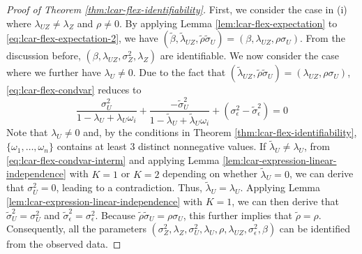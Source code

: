 \documentclass[11pt]{article}
\theoremstyle{definition}
\theoremstyle{remark}
\begin{document}
\begin{proof}[Proof of Theorem \ref{thm:lcar-flex-identifiability}]
First, we consider the case in (i) where $\lambda_{UZ}\neq\lambda_Z$ and $\rho \neq 0$. By applying Lemma \ref{lem:lcar-flex-expectation} to \eqref{eq:lcar-flex-expectation-2}, we have $(\tilde\beta, \tilde\lambda_{UZ}, \tilde\rho\tilde\sigma_U) = (\beta, \lambda_{UZ}, \rho\sigma_U)$. 
From the discussion before, $(\beta, \lambda_{UZ}, \sigma_Z^2, \lambda_Z)$ are identifiable. 
We now consider the case where we further have $\lambda_U\neq 0$. 
Due to the fact that $( \tilde\lambda_{UZ}, \tilde\rho\tilde\sigma_U) = ( \lambda_{UZ}, \rho\sigma_U)$, \eqref{eq:lcar-flex-condvar} reduces to 
\begin{equation}\label{eq:lcar-flex-condvar-interm}
\frac{\sigma_U^2}{1-\lambda_U+\lambda_U\omega_i} +
\frac{-\tilde\sigma_U^2}{1-\tilde\lambda_U+\tilde\lambda_U\omega_i} 
+ 
(\sigma_\epsilon^2 - \tilde\sigma_\epsilon^2) = 0
\end{equation} 
Note that $\lambda_U\neq 0$ and, by the conditions in Theorem \ref{thm:lcar-flex-identifiability}, $\{\omega_1,\ldots,\omega_n\}$ contains at least 3 distinct nonnegative values. If $\tilde\lambda_U \neq \lambda_U$, from \eqref{eq:lcar-flex-condvar-interm} and applying Lemma \ref{lem:lcar-expression-linear-independence} with $K=1$ or $K=2$ depending on whether $\tilde\lambda_U=0$, we can derive that $\sigma_U^2=0$, leading to a contradiction. Thus, $\tilde\lambda_U = \lambda_U$. Applying Lemma \ref{lem:lcar-expression-linear-independence} with $K=1$, we can then derive that $\tilde\sigma_U^2 = \sigma_U^2$ and $\tilde\sigma_\epsilon^2 = \sigma_\epsilon^2$. 
Because $\tilde\rho\tilde\sigma_U = \rho\sigma_U$, this further implies that $\tilde\rho = \rho$. 
Consequently, all the parameters $(\sigma_Z^2, \lambda_Z, \sigma_U^2, \lambda_U, \rho, \lambda_{UZ}, \sigma_\epsilon^2, \beta)$ can be identified from the observed data. 


\end{proof}
\end{document}
